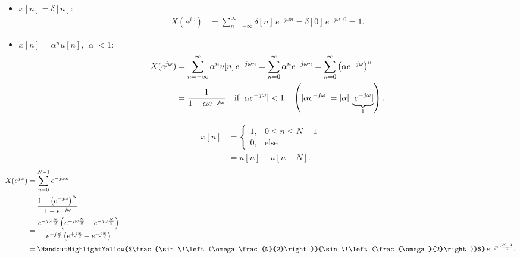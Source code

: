 \documentclass[handout_subfiles_root.tex]{subfiles}
\begin{document}
\begin{examplebox}[title={DTFT Examples}, handout mark=2]
\begin{itemize}
  \item $x[n] = \delta[n]$:
  \begin{align*}
    X(e^{j\omega}) &= \sum_{n=-\infty}^{\infty} \delta[n]\,e^{-j\omega n} = \delta[0]\,e^{-j\omega \cdot 0} = 1.
  \end{align*}
  \item $x[n] = \alpha^n u[n]$, $|\alpha|<1$:
  \begin{align*}
    X(e^{j\omega}) &= \sum_{n=-\infty}^{\infty} \alpha^n u[n]\,e^{-j\omega n}
      = \sum_{n=0}^{\infty} \alpha^n e^{-j\omega n} = \sum_{n=0}^{\infty} \left(\alpha e^{-j\omega}\right)^n \\
    &= \frac{1}{1-\alpha e^{-j\omega}} \quad \text{if } |\alpha e^{-j\omega}| < 1 \quad \left(|\alpha e^{-j\omega}| = |\alpha|\,\underbrace{|e^{-j\omega}|}_{\HandoutUnderbraceLabel{1}}\right).
  \end{align*}
\end{itemize}
\end{examplebox}

\begin{examplebox}[title={Example (Rectangular Window Sequence)}]
\begin{align*}
  x[n] &= \begin{cases} 1, & 0\le n \le N-1 \\ 0, & \text{else} \end{cases} \\
  &= u[n] - u[n-N].
\end{align*}%
%
\begin{align*}
  X(e^{j\omega}) &= \sum_{n=0}^{N-1} e^{-j\omega n} \\
  &= \frac{1-\left(e^{-j\omega}\right)^N}{1-e^{-j\omega}} \\
  &= \frac{e^{-j\omega\frac{N}{2}}\left(e^{+j\omega\frac{N}{2}}-e^{-j\omega\frac{N}{2}}\right)}{e^{-j\frac{\omega}{2}}\left(e^{+j\frac{\omega}{2}}-e^{-j\frac{\omega}{2}}\right)} \\
  &= \HandoutHighlightYellow{$\frac{\sin\!\left(\omega\frac{N}{2}\right)}{\sin\!\left(\frac{\omega}{2}\right)}$}\,e^{-j\omega\frac{N-1}{2}}.
\end{align*}
\end{examplebox}

\clearpage
{}
\end{document}

